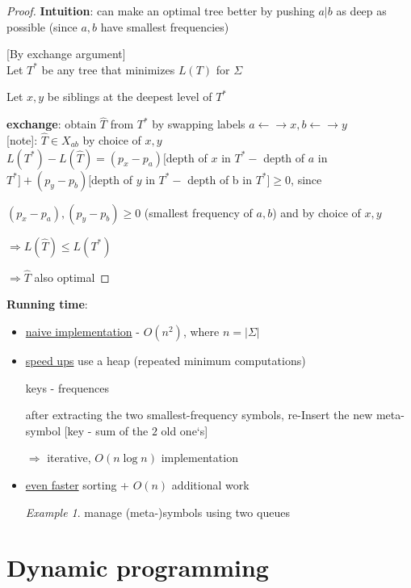 \documentclass[a4paper,12pt]{article}
\theoremstyle{plain}
\theoremstyle{definition}
\theoremstyle{remark}
\newtheorem*{example}{Example}
\begin{document}
\begin{proof}
\textbf{Intuition}: can make an optimal tree better by pushing $a|b$ as deep as possible (since $a, b$ have smallest frequencies)

[By exchange argument]
\\

Let $T^*$ be any tree that minimizes $L(T)$ for $\Sigma$

Let $x, y$ be siblings at the deepest level of $T^*$

\textbf{exchange}: obtain $\widehat{T}$ from $T^*$ by swapping labels $a \leftarrow\rightarrow x, b \leftarrow\rightarrow y$
\\

[note]: $\widehat{T} \in X_{ab}$ by choice of $x, y$
\\

$L(T^*) - L(\widehat{T}) = (p_x-p_a)[$depth of $x$ in $T^* -$ depth of $a$ in $T^*] + (p_y-p_b)[$depth of $y$ in $T^* -$ depth of b in $T^*] \geq 0$, since

$(p_x-p_a), (p_y-p_b) \geq 0$ (smallest frequency of $a,b$) and by choice of $x, y$

$\Rightarrow L(\widehat{T}) \leq L(T^*)$

$\Rightarrow \widehat{T}$ also optimal
\end{proof}

\textbf{Running time}:
\begin{itemize}
	\item \underline{naive implementation} - $O(n^2)$, where $n = |\Sigma|$
	\item \underline{speed ups} use a heap (repeated minimum computations)

	keys - frequences

	after extracting the two smallest-frequency symbols, re-Insert the new meta-symbol [key - sum of the $2$ old one`s]

	$\Rightarrow$ iterative, $O(n \log n)$ implementation
	\item \underline{even faster} sorting + $O(n)$ additional work

	\begin{example}manage (meta-)symbols using two queues\end{example}
\end{itemize}





\newpage
\section{Dynamic programming}
\end{document}
